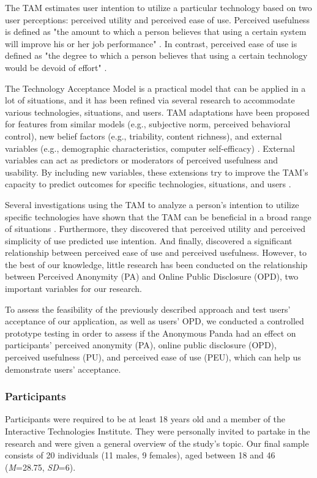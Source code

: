The TAM estimates user intention to utilize a particular technology based on two user perceptions: perceived utility and perceived ease of use. Perceived usefulness is defined as "the amount to which a person believes that using a certain system will improve his or her job performance" \cite{DAV89}. In contrast, perceived ease of use is defined as "the degree to which a person believes that using a certain technology would be devoid of effort" \cite{DAV89}.

The Technology Acceptance Model is a practical model that can be applied in a lot of situations, and it has been refined via several research to accommodate various technologies, situations, and users. TAM adaptations have been proposed for features from similar models (e.g., subjective norm, perceived behavioral control), new belief factors (e.g., triability, content richness), and external variables (e.g., demographic characteristics, computer self-efficacy) \cite{CAM20}. External variables can act as predictors or moderators of perceived usefulness and usability. By including new variables, these extensions try to improve the TAM's capacity to predict outcomes for specific technologies, situations, and users \cite{CAM20}.

Several investigations using the TAM to analyze a person's intention to utilize specific technologies have shown that the TAM can be beneficial in a broad range of situations \cite{CAM20}. Furthermore, they discovered that perceived utility and perceived simplicity of use predicted use intention. And finally, discovered a significant relationship between perceived ease of use and perceived usefulness. However, to the best of our knowledge, little research has been conducted on the relationship between Perceived Anonymity (PA) and Online Public Disclosure (OPD), two important variables for our research.

To assess the feasibility of the previously described approach and test users' acceptance of our application, as well as users' OPD, we conducted a controlled prototype testing in order to assess if the Anonymous Panda had an effect on participants' perceived anonymity (PA), online public disclosure (OPD), perceived usefulness (PU), and perceived ease of use (PEU), which can help us demonstrate users' acceptance.

\subsubsection{Participants}
Participants were required to be at least 18 years old and a member of the Interactive Technologies Institute. They were personally invited to partake in the research and were given a general overview of the study's topic. Our final sample consists of 20 individuals (11 males, 9 females), aged between 18 and 46 (\textit{M}=28.75, \textit{SD}=6).

